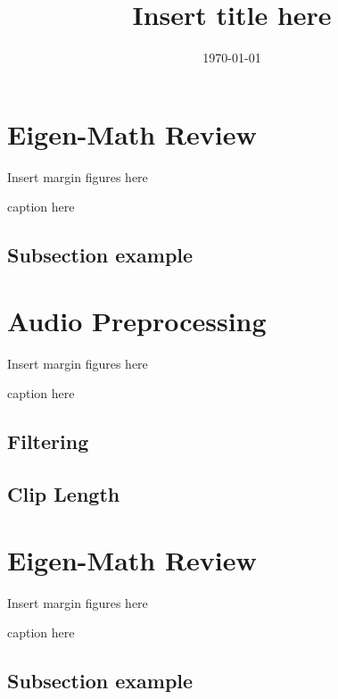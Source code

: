 \documentclass{tufte-handout}
\title{Insert title here}
\author{}
\date{\today}
\begin{document}
\maketitle

\vspace{0.1in}


\section{Eigen-Math Review}

\begin{marginfigure}
Insert margin figures here
\caption{caption here}
\end{marginfigure}

\subsection{Subsection example}



\section{Audio Preprocessing}

\begin{marginfigure}
Insert margin figures here
\caption{caption here}
\end{marginfigure}

\subsection{Filtering}

\subsection{Clip Length}



\section{Eigen-Math Review}

\begin{marginfigure}
Insert margin figures here
\caption{caption here}
\end{marginfigure}

\subsection{Subsection example}
\end{document}
